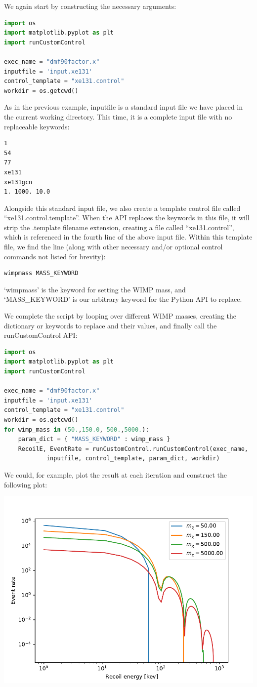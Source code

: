 \documentclass[11pt]{article}
\begin{document}
We again start by constructing the necessary arguments:
\begin{lstlisting}[language=python]
import os
import matplotlib.pyplot as plt
import runCustomControl

exec_name = "dmf90factor.x"
inputfile = 'input.xe131'
control_template = "xe131.control"
workdir = os.getcwd()
\end{lstlisting}
As in the previous example, inputfile is a standard input file we have placed in
the current working directory. This time, it is a complete input file with no
replaceable keywords:
\begin{verbatim}
1
54
77
xe131
xe131gcn
1. 1000. 10.0
\end{verbatim}
Alongside this standard input file, we also create a template control file
called ``xe131.control.template''. When the API replaces the keywords in this
file, it will strip the .template filename extension, creating a file called
``xe131.control'', which is referenced in the fourth line of the above input
file. Within this template file, we find the line (along with other necessary
and/or optional control commands not listed for brevity):
\begin{verbatim}
wimpmass MASS_KEYWORD
\end{verbatim}
`wimpmass' is the keyword for setting the WIMP mass, and `MASS\_KEYWORD' is our
arbitrary keyword for the Python API to replace.

We complete the script by looping over different WIMP masses, creating the
dictionary or keywords to replace and their values, and finally call the
runCustomControl API:
\begin{lstlisting}[language=python]
import os
import matplotlib.pyplot as plt
import runCustomControl

exec_name = "dmf90factor.x"
inputfile = 'input.xe131'
control_template = "xe131.control"
workdir = os.getcwd()
for wimp_mass in (50.,150.0, 500.,5000.):
    param_dict = { "MASS_KEYWORD" : wimp_mass }
    RecoilE, EventRate = runCustomControl.runCustomControl(exec_name,
            inputfile, control_template, param_dict, workdir)
\end{lstlisting}
We could, for example, plot the result at each iteration and construct the
following plot:

\includegraphics[width=.8 \textwidth]{xe131.WIMPmassCompare.pdf}
\end{document}
